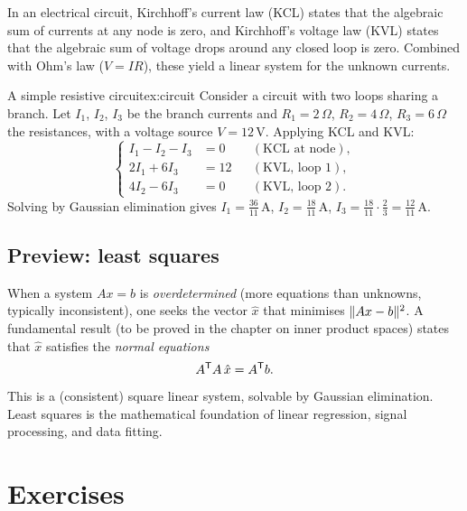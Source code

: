 In an electrical circuit, Kirchhoff's current law (KCL) states that
the algebraic sum of currents at any node is zero, and Kirchhoff's
voltage law (KVL) states that the algebraic sum of voltage drops
around any closed loop is zero. Combined with Ohm's law
($V = IR$), these yield a linear system for the
unknown currents.

\begin{example}{A simple resistive circuit}{ex:circuit}
Consider a circuit with two loops sharing a branch. Let $I_1$, $I_2$,
$I_3$ be the branch currents and $R_1 = 2\,\Omega$,
$R_2 = 4\,\Omega$, $R_3 = 6\,\Omega$ the resistances, with a
voltage source $V = 12$\,V. Applying KCL and KVL:
\[
  \left\{
  \begin{aligned}
    I_1 - I_2 - I_3 &= 0 && (\text{KCL at node}),\\
    2I_1 + 6I_3 &= 12 && (\text{KVL, loop 1}),\\
    4I_2 - 6I_3 &= 0 && (\text{KVL, loop 2}).
  \end{aligned}
  \right.
\]
Solving by Gaussian elimination gives
$I_1 = \frac{36}{11}$\,A,\;
$I_2 = \frac{18}{11}$\,A,\;
$I_3 = \frac{18}{11} \cdot \frac{2}{3} = \frac{12}{11}$\,A.
\end{example}


\subsection{Preview: least squares}\label{subsec:least-squares-preview}

When a system $Ax = b$ is \emph{overdetermined} (more equations than
unknowns, typically inconsistent), one seeks the vector $\hat{x}$
that minimises $\lVert Ax - b\rVert^2$. A fundamental result (to be proved
in the chapter on inner product spaces) states that $\hat{x}$
satisfies the \emph{normal equations}
\begin{equation}\label{eq:normal-equations}
  {A}^{\mathsf{T}}A\,\hat{x} = {A}^{\mathsf{T}}b.
\end{equation}
This is a (consistent) square linear system, solvable by Gaussian
elimination. Least squares is the mathematical foundation of linear
regression, signal processing, and data fitting.


\section{Exercises}\label{sec:exercises-systems}

